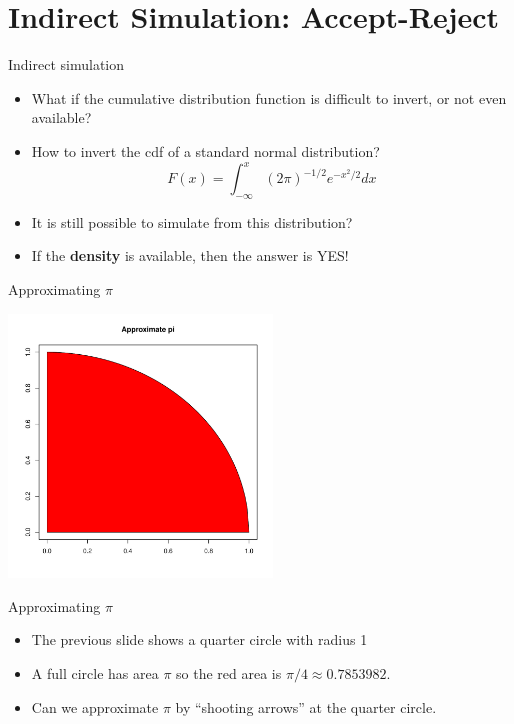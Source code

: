 \documentclass
[handout]
{beamer}
\begin{document}
\section{Indirect Simulation: Accept-Reject}
\begin{frame}{Indirect simulation}
\begin{itemize}
\item What if the cumulative distribution function is difficult to invert, or not even available?
\pause
\item How to invert the cdf of a standard normal distribution?
\pause
\begin{equation}
F(x)=\int_{-\infty}^{x}(2\pi)^{-1/2}e^{-x^2/2}dx
\end{equation}
\pause
\item It is still possible to simulate from this distribution?
\pause
\item If the {\bf density} is available, then the answer is YES!
\end{itemize}
\end{frame}
\begin{frame}{Approximating $\pi$}
\begin{center}
\includegraphics[height=7cm]{./Pics/appi1.pdf}
\end{center}
\end{frame}
\begin{frame}{Approximating $\pi$}
\begin{itemize}
\item The previous slide shows a quarter circle with radius 1
\pause
\item A full circle has area $\pi$ so the red area is $\pi/4\approx 0.7853982$.
\pause
\item Can we approximate $\pi$ by ``shooting arrows'' at the quarter circle. 
\end{itemize}
\end{frame}
\end{document}
